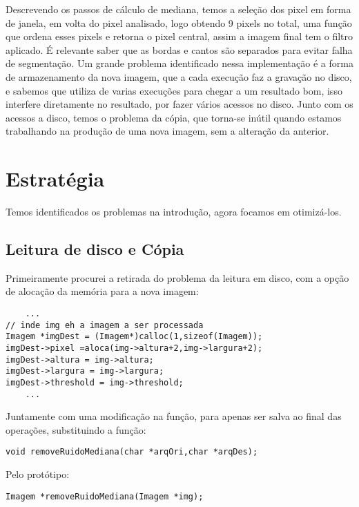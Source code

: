 \documentclass[10pt,journal,compsoc]{IEEEtran}
\begin{document}
Descrevendo os passos de cálculo de mediana, temos a seleção dos pixel em forma de janela, em volta do pixel analisado, logo obtendo 9 pixels no total, uma função que ordena esses pixels e retorna o pixel central, assim a imagem final tem o filtro aplicado. É relevante saber que as bordas e cantos são separados para evitar falha de segmentação.
Um grande problema identificado nessa implementação é a forma de armazenamento da nova imagem, que a cada execução faz a gravação no disco, e sabemos que utiliza de varias execuções para chegar a um resultado bom, isso interfere diretamente no resultado, por fazer vários acessos no disco. Junto com os acessos a disco, temos o problema da cópia, que torna-se inútil quando estamos trabalhando na produção de uma nova imagem, sem a alteração da anterior.

\section{Estratégia}
Temos identificados os problemas na introdução, agora focamos em otimizá-los.

\subsection{Leitura de disco e Cópia}
Primeiramente procurei a retirada do problema da leitura em disco, com a opção de alocação da memória para a nova imagem:

\begin{verbatim}
    ...
// inde img eh a imagem a ser processada
Imagem *imgDest = (Imagem*)calloc(1,sizeof(Imagem));
imgDest->pixel =aloca(img->altura+2,img->largura+2);
imgDest->altura = img->altura;
imgDest->largura = img->largura;
imgDest->threshold = img->threshold;
    ...
\end{verbatim}
\label{cod:1}

Juntamente com uma modificação na função, para apenas ser salva ao final das operações, substituindo a função:

\begin{verbatim}
void removeRuidoMediana(char *arqOri,char *arqDes);
\end{verbatim}

Pelo protótipo:

\begin{verbatim}
Imagem *removeRuidoMediana(Imagem *img);
\end{verbatim}
\end{document}
